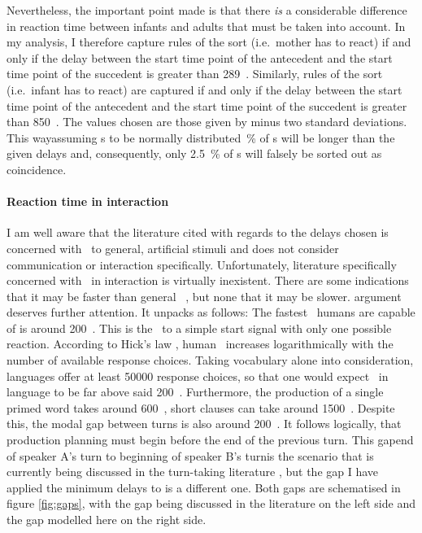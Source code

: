 Nevertheless, the important point made is that there \emph{is} a considerable difference in reaction time between infants and adults that must be taken into account.
In my analysis, I therefore capture rules of the sort  (i.e.~mother has to react) if and only if the delay between the start time point of the antecedent and the start time point of the succedent is greater than 289~\ms.
Similarly, rules of the sort  (i.e.~infant has to react) are captured if and only if the delay between the start time point of the antecedent and the start time point of the succedent is greater than 850~\ms.
The values chosen are those given by \citet{leibold_relationship_2002} minus two standard deviations.
This way\dash assuming \rt s to be normally distributed~\% of \rt s will be longer than the given delays \citep[]{moore_introduction_2017} and, consequently, only 2.5~\% of \rt s will falsely be sorted out as coincidence.

\paragraph{Reaction time in interaction}
I am well aware that the literature cited with regards to the delays chosen is concerned with \rt\ to general, artificial stimuli and does not consider communication or interaction specifically.
Unfortunately, literature specifically concerned with \rt\ in interaction is virtually inexistent.
There are some indications that it may be faster than general \rt\ \citep{levinson_turn-taking_2016}, but none that it may be slower.
 argument deserves further attention.
It unpacks as follows:
The fastest \rt\ humans are capable of is around 200~\ms.
This is the \rt\ to a simple start signal with only one possible reaction.
According to Hick's law \citep{hick_rate_1952}, human \rt\ increases logarithmically with the number of available response choices.
Taking vocabulary alone into consideration, languages offer at least 50000 response choices, so that one would expect \rt\ in language to be far above said 200~\ms.
Furthermore, the production of a single primed word takes around 600~\ms, short clauses can take around 1500~\ms.
Despite this, the modal gap between turns is also around 200~\ms.
It follows logically, that production planning must begin before the end of the previous turn.
This gap\dash end of speaker A's turn to beginning of speaker B's turn\dash is the scenario that is currently being discussed in the turn-taking literature \citep[e.g.][among many others]{bogels_listeners_2015,bogels_planning_2018,garrod_use_2015,levinson_timing_2015,riest_anticipation_2015}, but the gap I have applied the minimum delays to is a different one.
Both gaps are schematised in figure \ref{fig:gaps}, with the gap being discussed in the literature on the left side and the gap modelled here on the right side.

